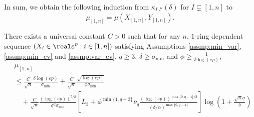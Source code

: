 \documentclass[aos]{imsart}
\begin{document}
\begin{appendix}
%
In sum, we obtain the following induction from $\kappa_{I|I'}(\delta)$ for $I \subsetneq [1,n]$ to
\begin{equation*}
    \mu_{[1,n]} = \mu(X_{[1,n]}, Y_{[1,n]}).
\end{equation*}
\begin{lemma} \label{thm:induction_lemma_BE_3P}
    There exists a universal constant $C > 0$ such that for any $n$, $1$-ring dependent sequence $(X_i \in \reals^p: i \in [1,n])$ satisfying Assumptions \eqref{assmp:min_var}, \eqref{assmp:min_ev} and \eqref{assmp:var_ev}, $q \geq 3$, $\delta \geq \sigma_{\min}$ and $\phi \geq \frac{1}{\delta \log(ep)}$,
    \begin{equation*}
    \begin{aligned}
        & \mu_{[1,n]} \\
        & \leq \frac{C}{\sqrt{n}} \frac{\delta \log(ep)}{\sigma_{\min}}  
        + \frac{C}{\sqrt{n}} \frac{\sqrt{\log(ep)}}{\phi \sigma_{\min}} \\
        & \quad + \frac{C}{\sqrt{n}} \frac{(\log(ep))^{5/2}}{\underline{\sigma}^2\sigma_{\min}} 
        \left[ 
            \bar{L}_{3}
            + \phi^{\min\{1, q-3\}} \bar\nu_{q} \frac{ {(\log(ep))}^{\max\{0, q-4\}/2}}{(\delta/\alpha)^{\max\{0, q-4\}}}
        \right]
        \log\left(1 + \frac{\sqrt{n}\underline{\sigma}}{\delta}\right)\\

\end{aligned}
\end{equation*}
\end{lemma}
\end{appendix}
\end{document}
